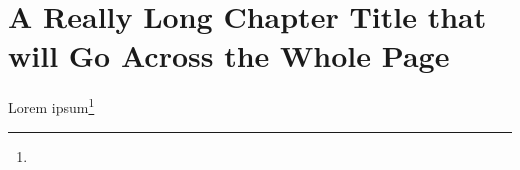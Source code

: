 \documentclass{tufte-book}
\begin{document}
\mainmatter

\chapter{A Really Long Chapter Title that will Go Across the Whole Page}

\lipsum[1]

Lorem ipsum\footnote{\lipsum[2]}\lipsum[1]
\end{document}
